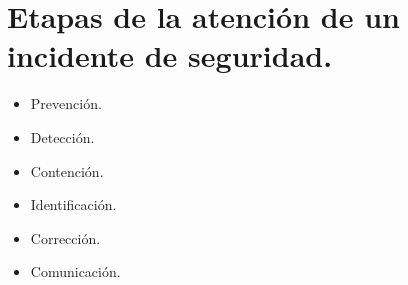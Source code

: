 \newpage

\chapter{Etapas de la atenci\'{o}n de un incidente de seguridad.}

\begin{itemize}
	\item Prevenci\'{o}n.
	\item Detecci\'{o}n.
	\item Contenci\'{o}n.
	\item Identificaci\'{o}n.
	\item Correcci\'{o}n.
	\item Comunicaci\'{o}n.
\end{itemize}
